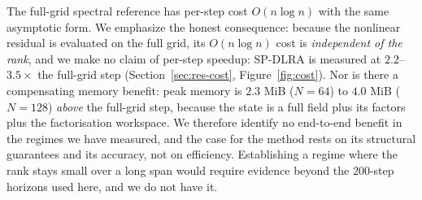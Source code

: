 The full-grid spectral reference has per-step cost $O(n \log n)$ with the same
asymptotic form. We emphasize the honest consequence: because the nonlinear
residual is evaluated on the full grid, its $O(n \log n)$ cost is
\emph{independent of the rank}, and we make no claim of per-step speedup:
SP-DLRA is measured at $2.2$--$3.5\times$ the full-grid step
(Section~\ref{sec:res-cost}, Figure~\ref{fig:cost}). Nor is there a compensating
memory benefit: peak memory is $2.3$ MiB ($N=64$) to $4.0$ MiB ($N=128$)
\emph{above} the full-grid step, because the state is a full field plus its
factors plus the factorisation workspace. We therefore identify no end-to-end
benefit in the regimes we have measured, and the case for the method rests on its
structural guarantees and its accuracy, not on efficiency. Establishing a regime
where the rank stays small over a long span would require evidence beyond the
$200$-step horizons used here, and we do not have it.
